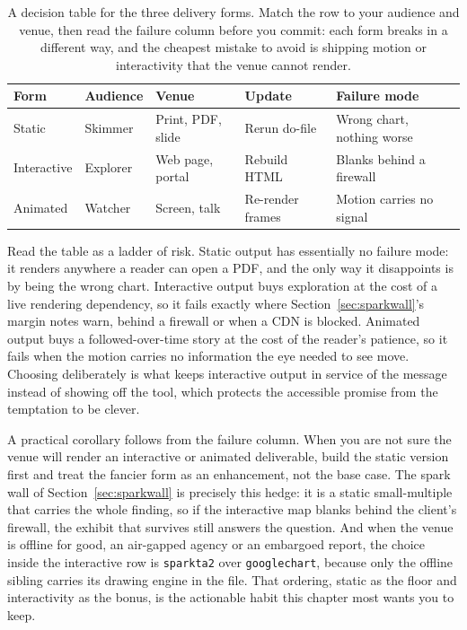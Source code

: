 \documentclass[
    a4paper,
    fontsize=10pt,
    twoside=true,
    numbers=noenddot,
]{kaobook}
\begin{document}
\begin{table}[htbp]
\centering
\caption[Choosing static, interactive, or animated]{A decision table for the three delivery forms. Match the row to your audience and venue, then read the failure column before you commit: each form breaks in a different way, and the cheapest mistake to avoid is shipping motion or interactivity that the venue cannot render.}
\label{tab:interactive-choice}
{\footnotesize
\begin{tabular}{lllll}
\hline
Form & Audience & Venue & Update & Failure mode \\
\hline
Static & Skimmer & Print, PDF, slide & Rerun do-file & Wrong chart, nothing worse \\
Interactive & Explorer & Web page, portal & Rebuild HTML & Blanks behind a firewall \\
Animated & Watcher & Screen, talk & Re-render frames & Motion carries no signal \\
\hline
\end{tabular}
}
\end{table}

Read the table as a ladder of risk. Static output has essentially no failure mode: it renders anywhere a reader can open a PDF, and the only way it disappoints is by being the wrong chart. Interactive output buys exploration at the cost of a live rendering dependency, so it fails exactly where Section~\ref{sec:sparkwall}'s margin notes warn, behind a firewall or when a CDN is blocked. Animated output buys a followed-over-time story at the cost of the reader's patience, so it fails when the motion carries no information the eye needed to see move. Choosing deliberately is what keeps interactive output in service of the message instead of showing off the tool, which protects the accessible promise from the temptation to be clever.

A practical corollary follows from the failure column. When you are not sure the venue will render an interactive or animated deliverable, build the static version first and treat the fancier form as an enhancement, not the base case. The spark wall of Section~\ref{sec:sparkwall} is precisely this hedge: it is a static small-multiple that carries the whole finding, so if the interactive map blanks behind the client's firewall, the exhibit that survives still answers the question. And when the venue is offline for good, an air-gapped agency or an embargoed report, the choice inside the interactive row is \texttt{sparkta2} over \texttt{googlechart}, because only the offline sibling carries its drawing engine in the file. That ordering, static as the floor and interactivity as the bonus, is the actionable habit this chapter most wants you to keep.
\end{document}

